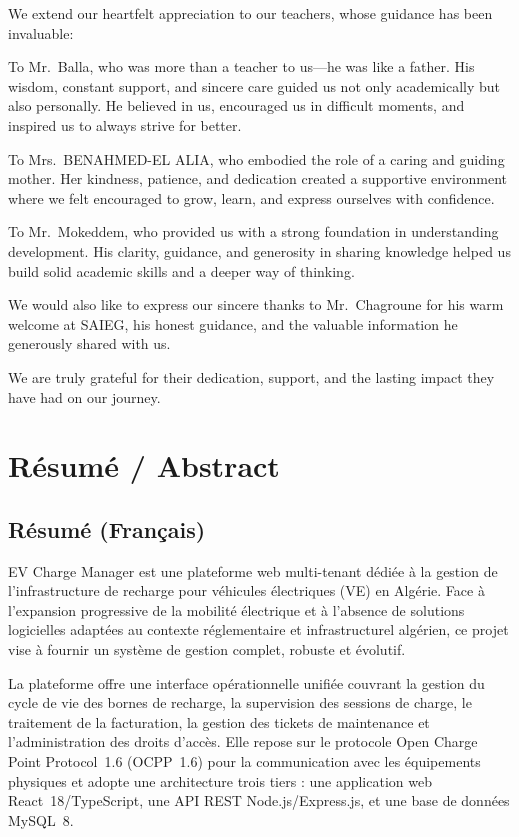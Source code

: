 \documentclass[12pt,a4paper]{report}
\begin{document}
We extend our heartfelt appreciation to our teachers, whose guidance has been invaluable:

To Mr.\ Balla, who was more than a teacher to us---he was like a father. His wisdom, constant
support, and sincere care guided us not only academically but also personally. He believed in
us, encouraged us in difficult moments, and inspired us to always strive for better.

To Mrs.\ BENAHMED-EL ALIA, who embodied the role of a caring and guiding mother. Her kindness,
patience, and dedication created a supportive environment where we felt encouraged to grow,
learn, and express ourselves with confidence.

To Mr.\ Mokeddem, who provided us with a strong foundation in understanding development. His
clarity, guidance, and generosity in sharing knowledge helped us build solid academic skills
and a deeper way of thinking.

We would also like to express our sincere thanks to Mr.\ Chagroune for his warm welcome at
SAIEG, his honest guidance, and the valuable information he generously shared with us.

We are truly grateful for their dedication, support, and the lasting impact they have had on
our journey.

\chapter*{Résumé / Abstract}

\section*{Résumé (Français)}

EV Charge Manager est une plateforme web multi-tenant dédiée à la gestion de l'infrastructure
de recharge pour véhicules électriques (VE) en Algérie. Face à l'expansion progressive de la
mobilité électrique et à l'absence de solutions logicielles adaptées au contexte réglementaire
et infrastructurel algérien, ce projet vise à fournir un système de gestion complet, robuste
et évolutif.

La plateforme offre une interface opérationnelle unifiée couvrant la gestion du cycle de vie
des bornes de recharge, la supervision des sessions de charge, le traitement de la facturation,
la gestion des tickets de maintenance et l'administration des droits d'accès. Elle repose sur
le protocole Open Charge Point Protocol~1.6 (OCPP~1.6) pour la communication avec les
équipements physiques et adopte une architecture trois tiers : une application web
React~18/TypeScript, une API REST Node.js/Express.js, et une base de données MySQL~8.
\end{document}

